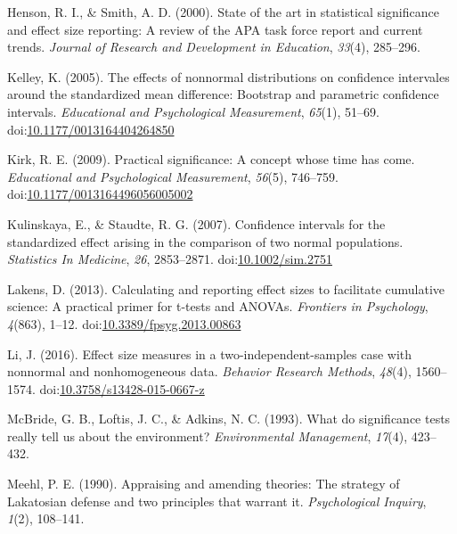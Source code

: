 \documentclass[
  man,floatsintext]{apa6}
\begin{document}
\leavevmode\hypertarget{ref-Henson_Smith_2000}{}%
Henson, R. I., \& Smith, A. D. (2000). State of the art in statistical significance and effect size reporting: A review of the APA task force report and current trends. \emph{Journal of Research and Development in Education}, \emph{33}(4), 285--296.

\leavevmode\hypertarget{ref-Kelley_2005}{}%
Kelley, K. (2005). The effects of nonnormal distributions on confidence intervales around the standardized mean difference: Bootstrap and parametric confidence intervals. \emph{Educational and Psychological Measurement}, \emph{65}(1), 51--69. doi:\href{https://doi.org/10.1177/0013164404264850}{10.1177/0013164404264850}

\leavevmode\hypertarget{ref-Kirk_2009}{}%
Kirk, R. E. (2009). Practical significance: A concept whose time has come. \emph{Educational and Psychological Measurement}, \emph{56}(5), 746--759. doi:\href{https://doi.org/10.1177/0013164496056005002\%20}{10.1177/0013164496056005002 }

\leavevmode\hypertarget{ref-Kulinskaya_Staudte_2007}{}%
Kulinskaya, E., \& Staudte, R. G. (2007). Confidence intervals for the standardized effect arising in the comparison of two normal populations. \emph{Statistics In Medicine}, \emph{26}, 2853--2871. doi:\href{https://doi.org/10.1002/sim.2751}{10.1002/sim.2751}

\leavevmode\hypertarget{ref-Lakens_2013}{}%
Lakens, D. (2013). Calculating and reporting effect sizes to facilitate cumulative science: A practical primer for t-tests and ANOVAs. \emph{Frontiers in Psychology}, \emph{4}(863), 1--12. doi:\href{https://doi.org/10.3389/fpsyg.2013.00863}{10.3389/fpsyg.2013.00863}

\leavevmode\hypertarget{ref-Li_2016}{}%
Li, J. (2016). Effect size measures in a two-independent-samples case with nonnormal and nonhomogeneous data. \emph{Behavior Research Methods}, \emph{48}(4), 1560--1574. doi:\href{https://doi.org/10.3758/s13428-015-0667-z}{10.3758/s13428-015-0667-z}

\leavevmode\hypertarget{ref-McBride_et_al_1993}{}%
McBride, G. B., Loftis, J. C., \& Adkins, N. C. (1993). What do significance tests really tell us about the environment? \emph{Environmental Management}, \emph{17}(4), 423--432.

\leavevmode\hypertarget{ref-Meehl_1990}{}%
Meehl, P. E. (1990). Appraising and amending theories: The strategy of Lakatosian defense and two principles that warrant it. \emph{Psychological Inquiry}, \emph{1}(2), 108--141.
\end{document}
